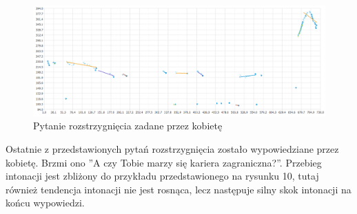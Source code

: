\documentclass[a4paper,12 pt]{article}
\begin{document}
 \FloatBarrier
\begin{figure}[h]
\centering
\includegraphics[scale=0.65]{pytanie_rozstrzygniecia_3_kobieta.png}
\caption{Pytanie rozstrzygnięcia zadane przez kobietę}
\end{figure}
\FloatBarrier
Ostatnie z przedstawionych pytań rozstrzygnięcia zostało wypowiedziane przez kobietę. Brzmi ono ''A czy Tobie marzy się kariera zagraniczna?''.  Przebieg intonacji jest zbliżony do przykładu przedstawionego na rysunku 10, tutaj również tendencja intonacji nie jest rosnąca, lecz następuje silny skok intonacji na końcu wypowiedzi.
\end{document}
